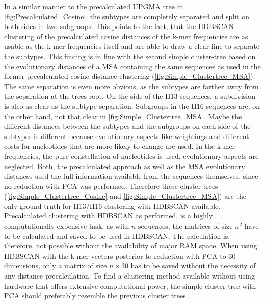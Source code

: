In a similar manner to the precalculated \gls{UPGMA} tree in \autoref{fig:Precalculated_Cosine}, the subtypes are completely separated and split on both sides in two subgroups. This points to the fact, that the \gls{HDBSCAN} clustering of the precalculated cosine distances of the k-mer frequencies are as usable as the k-mer frequencies itself and are able to draw a clear line to separate the subtypes. This finding is in line with the second simple cluster-tree based on the evolutionary distances of a \gls{MSA} containing the same sequences as used in the former precalculated cosine distance clustering (\autoref{fig:Simple_Clustertree_MSA}). The same separation is even more obvious, as the subtypes are farther away from the separation at the trees root. On the side of the H13 sequences, a subdivision is also as clear as the subtype separation. Subgroups in the H16 sequences are, on the other hand, not that clear in \autoref{fig:Simple_Clustertree_MSA}. Maybe the different distances between the subtypes and the subgroups on each side of the subtypes is different because evolutionary aspects like weightings and different costs for nucleotides that are more likely to change are used. In the k-mer frequencies, the pure constellation of nucleotides is used, evolutionary aspects are neglected. Both, the precalculated approach as well as the \gls{MSA} evolutionary distances used the full information available from the sequences themselves, since no reduction with \gls{PCA} was performed. Therefore these cluster trees (\autoref{fig:Simple_Clustertree_Cosine} and \autoref{fig:Simple_Clustertree_MSA}) are the only ground truth for H13/H16 clustering with \gls{HDBSCAN} available. Precalculated clustering with \gls{HDBSCAN} as performed, is a highly computationally expensive task, as with $n$ sequences, the matrices of size $n^2$ have to be calculated and saved to be used in \gls{HDBSCAN}. The calculation is, therefore, not possible without the availability of major RAM space. When using \gls{HDBSCAN} with the k-mer vectors posterior to reduction with \gls{PCA} to 30 dimensions, only a matrix of size $n\times 30$ has to be saved without the necessity of any distance precalculation. To find a clustering method available without using hardware that offers extensive computational power, the simple cluster tree with \gls{PCA} should preferably resemble the previous cluster trees.

